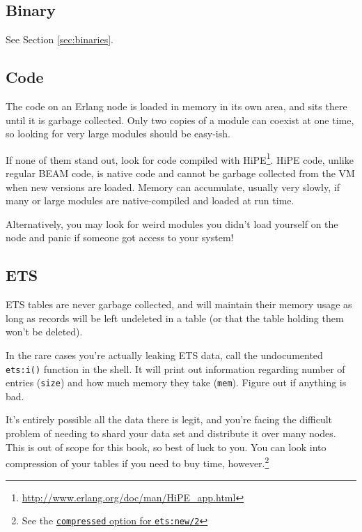 \documentclass[11pt, oneside]{book}   	%
\newcommand{\function}[1]{\Verb`#1`}
\newcommand{\expression}[1]{\Verb`#1`}
\begin{document}
\subsection{Binary}

See Section \ref{sec:binaries}.

\subsection{Code}

The code on an Erlang node is loaded in memory in its own area, and sits there until it is garbage collected. Only two copies of a module can coexist at one time, so looking for very large modules should be easy-ish.

If none of them stand out, look for code compiled with HiPE\footnote{\href{http://www.erlang.org/doc/man/HiPE\_app.html}{http://www.erlang.org/doc/man/HiPE\_app.html}}. HiPE code, unlike regular BEAM code, is native code and cannot be garbage collected from the VM when new versions are loaded. Memory can accumulate, usually very slowly, if many or large modules are native-compiled and loaded at run time.

Alternatively, you may look for weird modules you didn't load yourself on the node and panic if someone got access to your system!

\subsection{ETS}

ETS tables are never garbage collected, and will maintain their memory usage as long as records will be left undeleted in a table (or that the table holding them won't be deleted).

In the rare cases you're actually leaking ETS data, call the undocumented \function{ets:i()} function in the shell. It will print out information regarding number of entries (\expression{size}) and how much memory they take (\expression{mem}). Figure out if anything is bad.

It's entirely possible all the data there is legit, and you're facing the difficult problem of needing to shard your data set and distribute it over many nodes. This is out of scope for this book, so best of luck to you. You can look into compression of your tables if you need to buy time, however.\footnote{See the \href{http://www.erlang.org/doc/man/ets.html\#new-2}{\expression{compressed} option for \function{ets:new/2}}}
\end{document}

